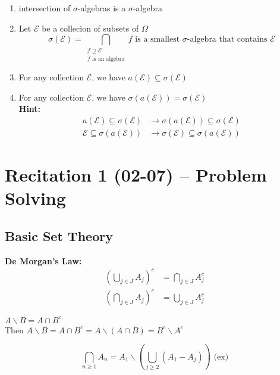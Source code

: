 \begin{proposition}{}{}
\begin{enumerate}[label=\circled{\arabic*}]
\item intersection of $ \sigma $-algebras is a $ \sigma $-algebra
\item Let $ \mathcal{E} $ be a collecion of subsets of $ \Omega $ 
$$
    \sigma(\mathcal{E})=\bigcap_{\substack{{f \supseteq  \mathcal{E}}\\{f \text{   is an algebra}}}}f \text{    is a smallest   } \sigma \text{-algebra that contains  } \mathcal{E}
$$ 
\item For any collection $\mathcal{E}$, we have $a(\mathcal{E}) \subseteq \sigma(\mathcal{E})$
\item For any collection $\mathcal{E}$, we have $\sigma(a(\mathcal{E})) = \sigma(\mathcal{E})$
\\\textbf{Hint:}
\begin{align*}
    a(\mathcal{E}) \subseteq \sigma(\mathcal{E}) &\rightarrow \sigma(a(\mathcal{E})) \subseteq \sigma(\mathcal{E})
    \\ \mathcal{E} \subseteq \sigma(a(\mathcal{E})) &\rightarrow \sigma(\mathcal{E}) \subseteq \sigma(a(\mathcal{E}))
\end{align*}
\end{enumerate}
\end{proposition}

\section[Recitation 1 (02-07) -- {Problem Solving (Algebra)}]{Recitation 1 (02-07) -- {Problem Solving}}
\subsection{Basic Set Theory}
\begin{definition}{}
\textbf{De Morgan's Law:}
\begin{align*}{}{}
    (\bigcup_{j\in J}A_j)^c&=\bigcap_{j\in J}A_j^c 
    \\(\bigcap_{j\in J}A_j)^c&=\bigcup_{j\in J}A_j^c
\end{align*}
\end{definition}
\begin{definition}[$\backslash$]{}
    $A \backslash B = A \cap B^c$
    \\Then $A \backslash B = A \cap B^c = A \backslash (A \cap B)= B^c \backslash A^c$
\end{definition}
\begin{remark}{}{}
$$
    \bigcap_{n \geq 1}A_n=A_1\backslash(\bigcup_{j \geq 2}(A_1-A_j)) \text{    (ex)}
$$ 
\end{remark}
